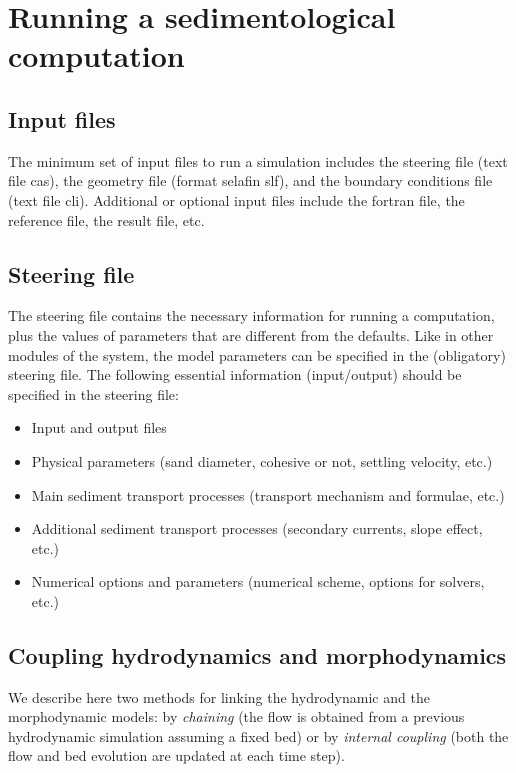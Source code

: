 \section{Running a sedimentological computation}\label{sec:running}

\subsection{Input files}
The minimum set of input files to run a \sisyphe simulation includes the steering file (text file {\sffamily cas}), the geometry file (format selafin {\sffamily slf}), and the boundary conditions file (text file {\sffamily cli}). Additional or optional input files include the fortran file, the reference file, the result file, etc.

\subsection{Steering file}
The steering file contains the necessary information for running a computation, plus the values of parameters
that are different from the defaults.
Like in other modules of the \tel system, the model parameters can
be specified in the (obligatory) \sisyphe steering file. The following essential information (input/output) should be specified in the steering file:
\begin{itemize}
\item Input and output files 
\item Physical parameters (sand diameter, cohesive or
not, settling velocity, etc.)
\item Main sediment transport processes (transport mechanism and formulae, etc.)
\item Additional sediment transport processes (secondary currents, slope effect, etc.)
\item Numerical options and parameters (numerical scheme, options for solvers, etc.)
\end{itemize}

\subsection{Coupling hydrodynamics and morphodynamics}\label{sec:running:subsec:coupling} 
We describe here two methods for linking the hydrodynamic and the
morphodynamic models: by \emph{chaining} (the flow is obtained from a previous
hydrodynamic simulation assuming a fixed bed) or by \emph{internal coupling} (both the
flow and bed evolution are updated at each time step).

